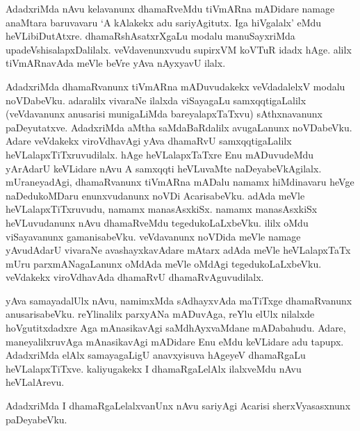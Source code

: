 AdadxriMda nAvu kelavanunx dhamaRveMdu tiVmARna mADidare namage anaMtara baruvavaru `A kAlakekx adu sariyAgitutx. Iga hiVgalalx' eMdu heVLibiDutAtxre. dhamaRshAsatxrXgaLu modalu manuSayxriMda upadeVshisalapxDalilalx. veVdavenunxvudu supirxVM koVTuR idadx hAge. alilx tiVmARnavAda meVle beVre yAva nAyxyavU ilalx.

AdadxriMda dhamaRvanunx tiVmARna mADuvudakekx veVdadalelxV modalu noVDabeVku. adaralilx vivaraNe ilalxda viSayagaLu samxqqtigaLalilx (veVdavanunx anusarisi munigaLiMda bareyalapxTaTxvu) sAthxnavanunx paDeyutatxve. AdadxriMda aMtha saMdaBaRdalilx avugaLanunx noVDabeVku. Adare veVdakekx viroVdhavAgi yAva dhamaRvU samxqqtigaLalilx heVLalapxTiTxruvudilalx. hAge heVLalapxTaTxre Enu mADuvudeMdu yArAdarU keVLidare nAvu A samxqqti heVLuvaMte naDeyabeVkAgilalx. mUraneyadAgi, dhamaRvanunx tiVmARna mADalu namamx hiMdinavaru heVge naDedukoMDaru enunxvudanunx noVDi AcarisabeVku. adAda meVle heVLalapxTiTxruvudu, namamx manasAsxkiSx. namamx manasAsxkiSx heVLuvudanunx nAvu dhamaRveMdu tegedukoLaLxbeVku. ililx oMdu viSayavanunx gamanisabeVku. veVdavanunx noVDida meVle namage yAvudAdarU vivaraNe avashayxkavAdare mAtarx adAda meVle heVLalapxTaTx mUru parxmANagaLanunx oMdAda meVle oMdAgi tegedukoLaLxbeVku. veVdakekx viroVdhavAda dhamaRvU dhamaRvAguvudilalx.

 yAva samayadalUlx nAvu, namimxMda sAdhayxvAda maTiTxge dhamaRvanunx anusarisabeVku. reYlinalilx parxyANa mADuvAga, reYlu elUlx nilalxde hoVgutitxdadxre Aga mAnasikavAgi saMdhAyxvaMdane mADabahudu. Adare, maneyalilxruvAga mAnasikavAgi mADidare Enu eMdu keVLidare adu tapupx. AdadxriMda elAlx samayagaLigU anavxyisuva hAgeyeV dhamaRgaLu heVLalapxTiTxve. kaliyugakekx I dhamaRgaLelAlx ilalxveMdu nAvu heVLalArevu.

AdadxriMda I dhamaRgaLelalxvanUnx nAvu sariyAgi Acarisi sherxVyasasxnunx paDeyabeVku.


\endchapter

